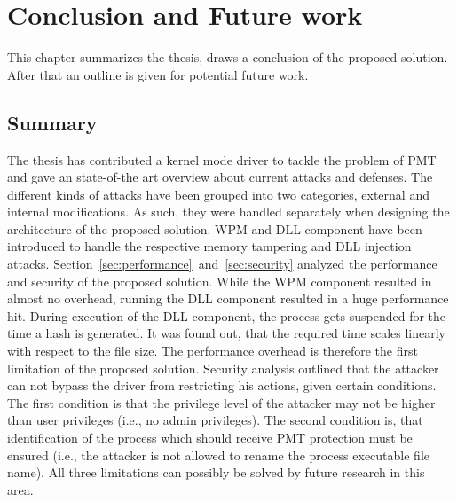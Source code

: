 \section{Conclusion and Future work}
\label{sec:futurework}
This chapter summarizes the thesis, draws a conclusion of the proposed solution. After that an outline is given for potential future work.
\subsection{Summary}
The thesis has contributed a kernel mode driver to tackle the problem of \gls{PMT} and gave an state-of-the art overview about current attacks and defenses. The different kinds of attacks have been grouped into two categories, external and internal modifications. As such, they were handled separately when designing the architecture of the proposed solution. \gls{WPM} and \gls{DLL} component have been introduced to handle the respective memory tampering and \gls{DLL} injection attacks. Section~\ref{sec:performance}~and~\ref{sec:security} analyzed the performance and security of the proposed solution. While the \gls{WPM} component resulted in almost no overhead, running the \gls{DLL} component resulted in a huge performance hit. During execution of the \gls{DLL} component, the process gets suspended for the time a hash is generated. It was found out, that the required time scales linearly with respect to the file size. The performance overhead is therefore the first limitation of the proposed solution. Security analysis outlined that the attacker can not bypass the driver from restricting his actions, given certain conditions. The first condition is that the privilege level of the attacker may not be higher than user privileges (i.e., no admin privileges). The second condition is, that identification of the process which should receive \gls{PMT} protection must be ensured (i.e., the attacker is not allowed to rename the process executable file name). All three limitations can possibly be solved by future research in this area.
